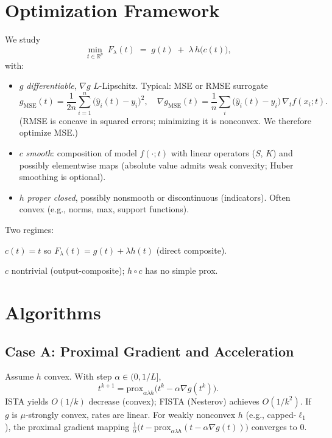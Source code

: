 \documentclass[11pt]{article}
\theoremstyle{plain}
\theoremstyle{definition}
\newcommand{\R}{\mathbb{R}}
\newcommand{\prox}{\mathrm{prox}}
\newcommand{\1}{\mathbf{1}}
\begin{document}
\section{Optimization Framework}
We study
\begin{equation}\label{eq:master}
 \min_{t\in\R^p}\; F_\lambda(t) \;=\; g(t) \;+\; \lambda\, h\big(c(t)\big),
\end{equation}
with:
\begin{itemize}[leftmargin=2em]
 \item $g$ \emph{differentiable}, $\nabla g$ $L$-Lipschitz. Typical: MSE or RMSE surrogate
 \[
 g_{\text{MSE}}(t)=\frac{1}{2n}\sum_{i=1}^n\big(\hat y_i(t)-y_i\big)^2,\quad
 \nabla g_{\text{MSE}}(t)=\frac{1}{n}\sum_i \big(\hat y_i(t)-y_i\big)\,\nabla_t f(x_i;t).
 \]
 (RMSE is concave in squared errors; minimizing it is nonconvex. We therefore optimize MSE.)
 \item $c$ \emph{smooth}: composition of model $f(\cdot;t)$ with linear operators ($S$, $K$) and possibly elementwise maps (absolute value admits weak convexity; Huber smoothing is optional).
 \item $h$ \emph{proper closed}, possibly nonsmooth or discontinuous (indicators). Often convex (e.g., norms, max, support functions).
\end{itemize}

Two regimes:
\begin{description}[leftmargin=2em,style=nextline]
 \item[Case A:] $c(t)=t$ so $F_\lambda(t)=g(t)+\lambda h(t)$ (direct composite).
 \item[Case B:] $c$ nontrivial (output-composite); $h\circ c$ has no simple prox.
\end{description}

\section{Algorithms}
\subsection{Case A: Proximal Gradient and Acceleration}
Assume $h$ convex. With step $\alpha\in(0,1/L]$,
\[
 t^{k+1}=\prox_{\alpha\lambda h}\!\big(t^k-\alpha\nabla g(t^k)\big).
\]
ISTA yields $O(1/k)$ decrease (convex); FISTA (Nesterov) achieves $O(1/k^2)$. If $g$ is $\mu$-strongly convex, rates are linear. For weakly nonconvex $h$ (e.g., capped-$\ell_1$), the proximal gradient mapping $\tfrac{1}{\alpha}\big(t-\prox_{\alpha\lambda h}(t-\alpha\nabla g(t))\big)$ converges to $0$.
\end{document}
